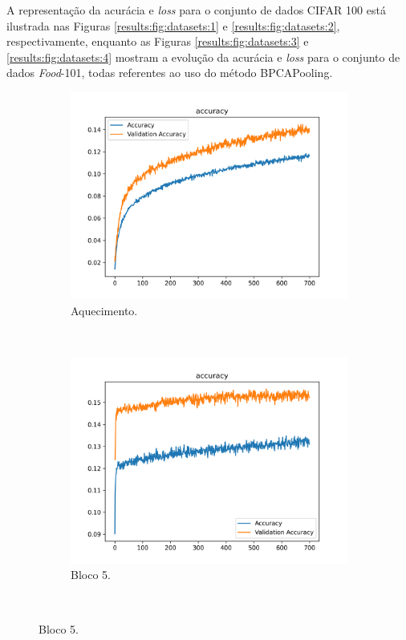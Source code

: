 A representação da acurácia e \textit{loss} para o conjunto de dados CIFAR 100 está ilustrada nas Figuras \ref{results:fig:datasets:1} e \ref{results:fig:datasets:2}, respectivamente, enquanto as Figuras \ref{results:fig:datasets:3} e \ref{results:fig:datasets:4} mostram a evolução da acurácia e \textit{loss} para o conjunto de dados \textit{Food}-101, todas referentes ao uso do método BPCAPooling.


\begin{figure}[H]
    \centering
    \caption{Evolução de Acurácia no conjunto de dados CIFAR 100.}
    \label{results:fig:datasets:1}
     \begin{subfigure}[t]{0.45\textwidth}
         \centering
         \includegraphics[width=1\linewidth]{recursos/imagens/results/cifar_wp_accuracy.png}
         \caption{Aquecimento.}
         \label{results:fig:datasets:1.1}
     \end{subfigure}%
     ~ 
     \begin{subfigure}[t]{0.45\textwidth}
         \centering
         \includegraphics[width=1\linewidth]{recursos/imagens/results/cifar_accuracy1.png}
         \caption{Bloco 5.}
         \label{results:fig:datasets:1.2}
     \end{subfigure}%
     ~ 
     

\end{figure}
